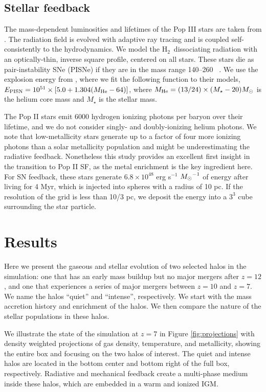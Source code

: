 \documentclass[12pt]{article}
\newcommand{\hh}{H$_2$}
\newcommand{\Ms}{\ifmmode{M_\odot}\else{$M_\odot$}\fi}
\begin{document}
\subsection*{Stellar feedback}

The mass-dependent luminosities and lifetimes of the Pop III stars are
taken from \cite{Schaerer02}.  The radiation field is evolved with
adaptive ray tracing \cite{Abel02_RT, Wise10} and is coupled
self-consistently to the hydrodynamics.  We model the \hh~dissociating
radiation with an optically-thin, inverse square profile, centered on
all stars.  These stars die as pair-instability SNe (PISNe) if they
are in the mass range 140--260 \Ms~\cite{Heger03}.  We use the
explosion energy from \cite{Heger02}, where we fit the following
function to their models, $E_{\rm PISN} = 10^{51} \times [5.0 + 1.304
(M_{\rm He} - 64)]$, where $M_{\rm He} = (13/24) \times (M_\star - 20)
\Ms$ is the helium core mass and $M_\star$ is the stellar mass.

The Pop II stars emit 6000 hydrogen ionizing photons per baryon over
their lifetime, and we do not consider singly- and doubly-ionizing
helium photons.  We note that low-metallicity stars generate up to a
factor of four more ionizing photons than a solar metallicity
population \cite{Schaerer03} and might be underestimating the
radiative feedback.  Nonetheless this study provides an excellent
first insight in the transition to Pop II SF, as the metal enrichment
is the key ingredient here.  For SN feedback, these stars generate
$6.8 \times 10^{48}$ erg s$^{-1}$ $\Ms^{-1}$ of energy after living
for 4 Myr, which is injected into spheres with a radius of 10 pc.  If
the resolution of the grid is less than 10/3 pc, we deposit the energy
into a $3^3$ cube surrounding the star particle.

\section*{Results}
\label{sec:results}

Here we present the gaseous and stellar evolution of two selected
halos in the simulation: one that has an early mass buildup but no
major mergers after $z=12$, and one that experiences a series of major
mergers between $z=10$ and $z=7$.  We name the halos ``quiet'' and
``intense'', respectively.  We start with the mass accretion history
and enrichment of the halos.  We then compare the nature of the
stellar populations in these halos.

We illustrate the state of the simulation at $z=7$ in Figure
\ref{fig:projections} with density weighted projections of gas
density, temperature, and metallicity, showing the entire box and
focusing on the two halos of interest.  The quiet and intense halos
are located in the bottom center and bottom right of the full box,
respectively.  Radiative and mechanical feedback create a multi-phase
medium inside these halos, which are embedded in a warm and ionized
IGM.
\end{document}
